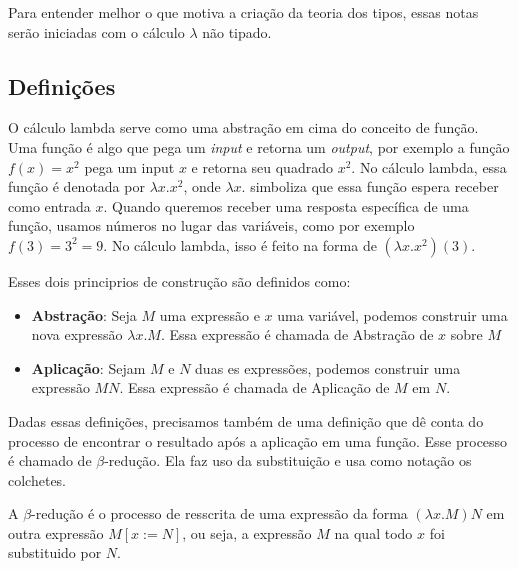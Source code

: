 \documentclass[../main.tex]{subfiles}
\begin{document}
Para entender melhor o que motiva a criação da teoria dos tipos, essas notas serão iniciadas com o cálculo $\lambda$ não tipado.

\subsection{Definições}

O cálculo lambda serve como uma abstração em cima do conceito de função. Uma função é algo que pega um \emph{input} e retorna um \emph{output}, por exemplo a função $f(x) = x^2$ pega um input $x$ e retorna seu quadrado $x^2$. No cálculo lambda, essa função é denotada por $\lambda x. x^2$, onde $\lambda x .$ simboliza que essa função espera receber como entrada $x$. Quando queremos receber uma resposta específica de uma função, usamos números no lugar das variáveis, como por exemplo $f(3) = 3^2 = 9$. No cálculo lambda, isso é feito na forma de $(\lambda x. x^2)(3)$. 

Esses dois principrios de construção são definidos como:

\begin{definition}
    \hfill
    \begin{itemize}
        \item \textbf{Abstração}: Seja $M$ uma expressão e $x$ uma variável, podemos construir uma nova expressão $\lambda x . M$. Essa expressão é chamada de Abstração de $x$ sobre $M$
        \item \textbf{Aplicação}: Sejam $M$ e $N$ duas es expressões, podemos construir uma expressão $M N$. Essa expressão é chamada de Aplicação de $M$ em $N$.
    \end{itemize}
\end{definition}

Dadas essas definições, precisamos também de uma definição que dê conta do processo de encontrar o resultado após a aplicação em uma função. Esse processo é chamado de $\beta$-redução. Ela faz uso da substituição e usa como notação os colchetes.

\begin{definition}
    A $\beta$-redução é o processo de resscrita de uma expressão da forma $(\lambda x . M)N$ em outra expressão $M[x := N]$, ou seja, a expressão $M$ na qual todo $x$ foi substituido por $N$.    
\end{definition}
\end{document}
